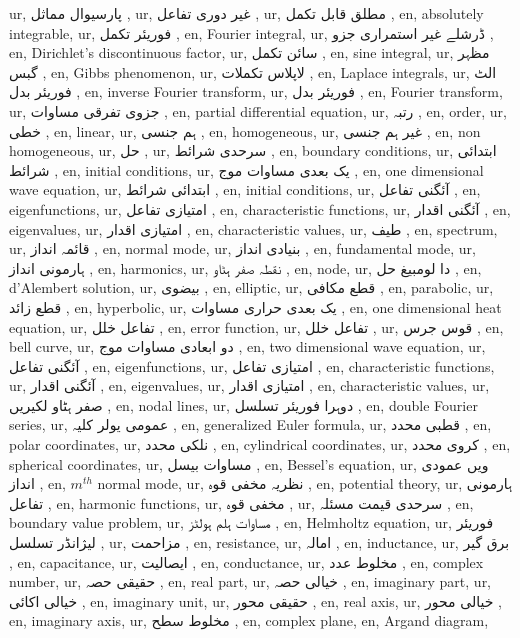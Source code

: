 ur, پارسیوال مماثل ,
ur, غیر دوری تفاعل ,
ur, مطلق قابل تکمل ,
en, absolutely integrable,
ur, فوریئر تکمل ,
en, ّFourier integral,
ur, ڈرشلے غیر استمراری جزو ,
en, Dirichlet's discontinuous factor,
ur, سائن تکمل ,
en, sine integral,
ur, مظہر گبس ,
en, Gibbs phenomenon,
ur, لاپلاس تکملات ,
en, Laplace integrals,
ur, الٹ فوریئر بدل ,
en, inverse Fourier transform,
ur, فوریئر بدل ,
en, Fourier transform,
ur, جزوی تفرقی مساوات ,
en, partial differential equation,
ur, رتبہ ,
en, order,
ur, خطی ,
en, linear,
ur, ہم جنسی ,
en, homogeneous,
ur, غیر ہم جنسی ,
en, non homogeneous,
ur, حل ,
ur, سرحدی شرائط ,
en, boundary conditions,
ur, ابتدائی شرائط ,
en, initial conditions,
ur, یک بعدی مساوات موج ,
en, one dimensional wave equation,
ur, ابتدائی شرائط ,
en, initial conditions,
ur, آئگنی تفاعل ,
en, eigenfunctions,
ur, امتیازی تفاعل ,
en, characteristic functions,
ur, آئگنی اقدار ,
en, eigenvalues,
ur, امتیازی اقدار ,
en, characteristic values,
ur, طیف ,
en, spectrum,
ur, قائمہ انداز ,
en, normal mode,
ur, بنیادی انداز ,
en, fundamental mode,
ur, ہارمونی انداز ,
en, harmonics,
ur, نقطہ صفر ہٹاو ,
en, node,
ur, دا لومبیغ حل ,
en, d'Alembert solution,
ur, بیضوی ,
en, elliptic,
ur, قطع مکافی ,
en, parabolic,
ur, قطع زائد ,
en, hyperbolic,
ur, یک بعدی حراری مساوات ,
en, one dimensional heat equation,
ur, تفاعل خلل ,
en, error function,
ur, تفاعل خلل ,
ur, قوس جرس ,
en, bell curve,
ur, دو ابعادی مساوات موج ,
en, two dimensional wave equation,
ur, آئگنی تفاعل ,
en, eigenfunctions,
ur, امتیازی تفاعل ,
en, characteristic functions,
ur, آئگنی اقدار ,
en, eigenvalues,
ur, امتیازی اقدار ,
en, characteristic values,
ur, صفر ہٹاو لکیریں ,
en, nodal lines,
ur, دوہرا فوریئر تسلسل ,
en, double Fourier series,
ur, عمومی یولر کلیہ ,
en, generalized Euler formula,
ur, قطبی محدد ,
en, polar coordinates,
ur, نلکی محدد ,
en, cylindrical coordinates,
ur, کروی محدد ,
en, spherical coordinates,
ur, مساوات بیسل ,
en, Bessel's equation,
ur,  ویں عمودی انداز ,
en, $m^{th}$ normal mode,
ur, نظریہ مخفی قوہ ,
en, potential theory,
ur, ہارمونی تفاعل ,
en, harmonic functions,
ur, مخفی قوہ ,
ur, سرحدی قیمت مسئلہ ,
en, boundary value problem,
ur, مساوات ہلم ہولٹز ,
en, Helmholtz equation,
ur, فوریئر لیژانڈر تسلسل ,
ur, مزاحمت ,
en, resistance,
ur, امالہ ,
en, inductance,
ur, برق گیر ,
en, capacitance,
ur, ایصالیت ,
en, conductance,
ur, مخلوط عدد ,
en, complex number,
ur, حقیقی حصہ ,
en, real part,
ur, خیالی حصہ ,
en, imaginary part,
ur, خیالی اکائی ,
en, imaginary unit,
ur, حقیقی محور ,
en, real axis,
ur, خیالی محور ,
en, imaginary axis,
ur, مخلوط سطح ,
en, complex plane,
en, Argand diagram,
